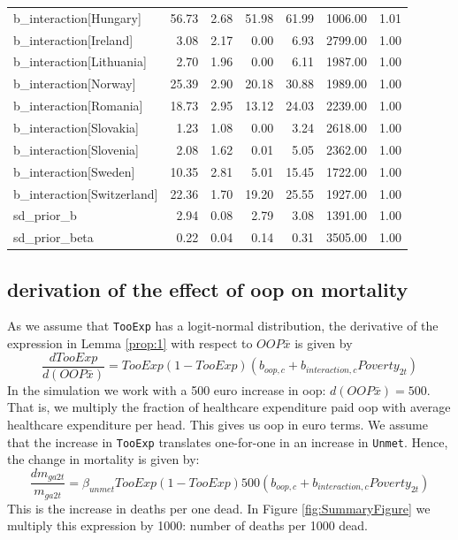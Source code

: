 \documentclass[a4paper,12pt]{article}
\begin{document}
\begin{table}[htbp]
\begin{tabular}{lrrrrrr}
b\_interaction[Hungary] & 56.73 & 2.68 & 51.98 & 61.99 & 1006.00 & 1.01\\
b\_interaction[Ireland] & 3.08 & 2.17 & 0.00 & 6.93 & 2799.00 & 1.00\\
b\_interaction[Lithuania] & 2.70 & 1.96 & 0.00 & 6.11 & 1987.00 & 1.00\\
b\_interaction[Norway] & 25.39 & 2.90 & 20.18 & 30.88 & 1989.00 & 1.00\\
b\_interaction[Romania] & 18.73 & 2.95 & 13.12 & 24.03 & 2239.00 & 1.00\\
b\_interaction[Slovakia] & 1.23 & 1.08 & 0.00 & 3.24 & 2618.00 & 1.00\\
b\_interaction[Slovenia] & 2.08 & 1.62 & 0.01 & 5.05 & 2362.00 & 1.00\\
b\_interaction[Sweden] & 10.35 & 2.81 & 5.01 & 15.45 & 1722.00 & 1.00\\
b\_interaction[Switzerland] & 22.36 & 1.70 & 19.20 & 25.55 & 1927.00 & 1.00\\
sd\_prior\_b & 2.94 & 0.08 & 2.79 & 3.08 & 1391.00 & 1.00\\
sd\_prior\_beta & 0.22 & 0.04 & 0.14 & 0.31 & 3505.00 & 1.00\\
\end{tabular}
\end{table}


\subsection{derivation of the effect of oop on mortality}
\label{sec:orgf0b0699}

As we assume that \texttt{TooExp} has a logit-normal distribution, the derivative of the expression in Lemma \ref{prop:1} with respect to \(OOP \bar{x}\) is given by
\begin{equation}
\frac{dTooExp}{d(OOP \bar{x})} = TooExp(1-TooExp) (b_{oop,c} + b_{interaction,c} Poverty_{2t})
\end{equation}
In the simulation we work with a 500 euro increase in oop: \(d(OOP \bar{x})=500\). That is, we multiply the fraction of healthcare expenditure paid oop with average healthcare expenditure per head. This gives us oop in euro terms. We assume that the increase in \texttt{TooExp} translates one-for-one in an increase in \texttt{Unmet}. Hence, the change in mortality is given by:
\begin{equation}
\label{eq:effect_per_1000}
\frac{dm_{ga2t}}{m_{ga2t}} = \beta_{unmet} TooExp(1-TooExp) 500 (b_{oop,c} + b_{interaction,c} Poverty_{2t})
\end{equation}
This is the increase in deaths per one dead. In Figure \ref{fig:SummaryFigure} we multiply this expression by 1000: number of deaths per 1000 dead.
\end{document}
